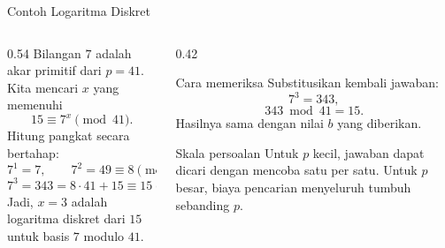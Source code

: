 \documentclass[aspectratio=169,11pt]{beamer}
\begin{document}
\begin{frame}{Contoh Logaritma Diskret}
    \begin{columns}[T,onlytextwidth]
        \begin{column}{0.54\textwidth}
            \footnotesize
            Bilangan $7$ adalah akar primitif dari $p = 41$. Kita mencari
            $x$ yang memenuhi
            \[
                15 \equiv 7^{x} \pmod{41} .
            \]
            Hitung pangkat secara bertahap:
            \[
                7^{1} = 7, \qquad
                7^{2} = 49 \equiv 8 \pmod{41},
            \]
            \[
                7^{3} = 343 = 8 \cdot 41 + 15 \equiv 15 \pmod{41} .
            \]
            Jadi, $x = 3$ adalah logaritma diskret dari $15$ untuk basis $7$
            modulo $41$.
        \end{column}
        \begin{column}{0.42\textwidth}
            \begin{exampleblock}{Cara memeriksa}
                \footnotesize
                Substitusikan kembali jawaban:
                \[
                    7^{3} = 343,
                \]
                \[
                    343 \bmod 41 = 15 .
                \]
                Hasilnya sama dengan nilai $b$ yang diberikan.
            \end{exampleblock}
            \begin{alertblock}{Skala persoalan}
                \footnotesize
                Untuk $p$ kecil, jawaban dapat dicari dengan mencoba satu per
                satu. Untuk $p$ besar, biaya pencarian menyeluruh tumbuh
                sebanding $p$.
            \end{alertblock}
        \end{column}
    \end{columns}
\end{frame}
\end{document}
